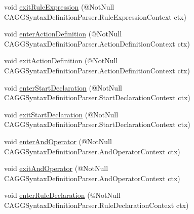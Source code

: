 \begin{DoxyCompactItemize}
\item 
void \hyperlink{interfaceit_1_1emarolab_1_1cagg_1_1core_1_1language_1_1parser_1_1ANTLRInterface_1_1ANTLRGenerate8f089aac366bd2683be460c907cc6185_a97647cef65d75dfca61439c815983d6c}{exit\-Rule\-Expression} (@Not\-Null C\-A\-G\-G\-Syntax\-Definition\-Parser.\-Rule\-Expression\-Context ctx)
\item 
void \hyperlink{interfaceit_1_1emarolab_1_1cagg_1_1core_1_1language_1_1parser_1_1ANTLRInterface_1_1ANTLRGenerate8f089aac366bd2683be460c907cc6185_a1ef1b1ab42a30ba4f317c5e719dd103f}{enter\-Action\-Definition} (@Not\-Null C\-A\-G\-G\-Syntax\-Definition\-Parser.\-Action\-Definition\-Context ctx)
\item 
void \hyperlink{interfaceit_1_1emarolab_1_1cagg_1_1core_1_1language_1_1parser_1_1ANTLRInterface_1_1ANTLRGenerate8f089aac366bd2683be460c907cc6185_a482eb9fe35438be8167d7616356db285}{exit\-Action\-Definition} (@Not\-Null C\-A\-G\-G\-Syntax\-Definition\-Parser.\-Action\-Definition\-Context ctx)
\item 
void \hyperlink{interfaceit_1_1emarolab_1_1cagg_1_1core_1_1language_1_1parser_1_1ANTLRInterface_1_1ANTLRGenerate8f089aac366bd2683be460c907cc6185_aa30ca821b2c98856ee1dc11e7b73344f}{enter\-Start\-Declaration} (@Not\-Null C\-A\-G\-G\-Syntax\-Definition\-Parser.\-Start\-Declaration\-Context ctx)
\item 
void \hyperlink{interfaceit_1_1emarolab_1_1cagg_1_1core_1_1language_1_1parser_1_1ANTLRInterface_1_1ANTLRGenerate8f089aac366bd2683be460c907cc6185_a1c55810dfa2276aa029808274bcbe06c}{exit\-Start\-Declaration} (@Not\-Null C\-A\-G\-G\-Syntax\-Definition\-Parser.\-Start\-Declaration\-Context ctx)
\item 
void \hyperlink{interfaceit_1_1emarolab_1_1cagg_1_1core_1_1language_1_1parser_1_1ANTLRInterface_1_1ANTLRGenerate8f089aac366bd2683be460c907cc6185_a66b78ded98e90f37443be3774c3ba7e9}{enter\-And\-Operator} (@Not\-Null C\-A\-G\-G\-Syntax\-Definition\-Parser.\-And\-Operator\-Context ctx)
\item 
void \hyperlink{interfaceit_1_1emarolab_1_1cagg_1_1core_1_1language_1_1parser_1_1ANTLRInterface_1_1ANTLRGenerate8f089aac366bd2683be460c907cc6185_abf0da7f1747e1d1763d484efe18d7f92}{exit\-And\-Operator} (@Not\-Null C\-A\-G\-G\-Syntax\-Definition\-Parser.\-And\-Operator\-Context ctx)
\item 
void \hyperlink{interfaceit_1_1emarolab_1_1cagg_1_1core_1_1language_1_1parser_1_1ANTLRInterface_1_1ANTLRGenerate8f089aac366bd2683be460c907cc6185_a7575bb0acf9a3a9e12447e262978211e}{enter\-Rule\-Declaration} (@Not\-Null C\-A\-G\-G\-Syntax\-Definition\-Parser.\-Rule\-Declaration\-Context ctx)

\end{DoxyCompactItemize}
